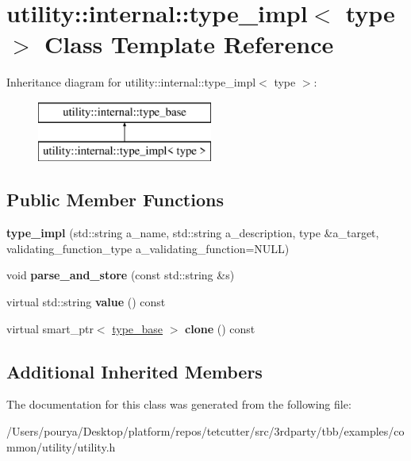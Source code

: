 \hypertarget{classutility_1_1internal_1_1type__impl}{}\section{utility\+:\+:internal\+:\+:type\+\_\+impl$<$ type $>$ Class Template Reference}
\label{classutility_1_1internal_1_1type__impl}
Inheritance diagram for utility\+:\+:internal\+:\+:type\+\_\+impl$<$ type $>$\+:\begin{figure}[H]
\begin{center}
\leavevmode
\includegraphics[height=2.000000cm]{classutility_1_1internal_1_1type__impl}
\end{center}
\end{figure}
\subsection*{Public Member Functions}
\begin{DoxyCompactItemize}
\item 
\hypertarget{classutility_1_1internal_1_1type__impl_aef2b82682aa619525df415ea1287d7f6}{}{\bfseries type\+\_\+impl} (std\+::string a\+\_\+name, std\+::string a\+\_\+description, type \&a\+\_\+target, validating\+\_\+function\+\_\+type a\+\_\+validating\+\_\+function=N\+U\+L\+L)\label{classutility_1_1internal_1_1type__impl_aef2b82682aa619525df415ea1287d7f6}

\item 
\hypertarget{classutility_1_1internal_1_1type__impl_a4db329ca31e6cab112bf6592fe96e352}{}void {\bfseries parse\+\_\+and\+\_\+store} (const std\+::string \&s)\label{classutility_1_1internal_1_1type__impl_a4db329ca31e6cab112bf6592fe96e352}

\item 
\hypertarget{classutility_1_1internal_1_1type__impl_a1361db91a84f2f760f46c827470a9322}{}virtual std\+::string {\bfseries value} () const \label{classutility_1_1internal_1_1type__impl_a1361db91a84f2f760f46c827470a9322}

\item 
\hypertarget{classutility_1_1internal_1_1type__impl_aeafe75e50ab69302450958837d5b2571}{}virtual smart\+\_\+ptr$<$ \hyperlink{classutility_1_1internal_1_1type__base}{type\+\_\+base} $>$ {\bfseries clone} () const \label{classutility_1_1internal_1_1type__impl_aeafe75e50ab69302450958837d5b2571}

\end{DoxyCompactItemize}
\subsection*{Additional Inherited Members}


The documentation for this class was generated from the following file\+:\begin{DoxyCompactItemize}
\item 
/\+Users/pourya/\+Desktop/platform/repos/tetcutter/src/3rdparty/tbb/examples/common/utility/utility.\+h\end{DoxyCompactItemize}
